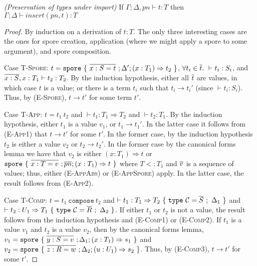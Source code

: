 \begin{lemma}
\emph{(Preservation of types under import)}
\label{appdx:lem:pres-import}
If $\Gamma ; \Delta, pn \vdash t : T$ then $\Gamma ; \Delta \vdash insert(pn, t) : T$
\end{lemma}
\begin{proof}
By induction on a derivation of $t : T$. The only three interesting cases are
the ones for spore creation, application (where we might apply a spore to some
argument), and spore composition.

Case \textsc{T-Spore}: $t = \texttt{spore}~\{~\overline{x : S = t}~; \Delta'; (x: T_1) \Rightarrow t_2~\}$, $\forall t_i \in \overline{t}.~\vdash t_i : S_i$, and $\overline{x : S}, x : T_1 \vdash t_2 : T_2$. By the induction hypothesis, either all $\overline{t}$ are values, in which case $t$ is a value; or there is a term $t_i$ such that $t_i \rightarrow t_i'$ (since $\vdash t_i : S_i$). Thus, by (\textsc{E-Spore}), $t \rightarrow t'$ for some term $t'$.

Case \textsc{T-App}: $t = t_1~t_2$ and $\vdash t_1 : T_1 \Rightarrow T_2$ and $\vdash t_2 : T_1$. By the induction hypothesis, either $t_1$ is a value $v_1$, or $t_1 \rightarrow t_1'$. In the latter case it follows from (\textsc{E-App1}) that $t \rightarrow t'$ for some $t'$. In the former case, by the induction hypothesis $t_2$ is either a value $v_2$ or $t_2 \rightarrow t_2'$. In the former case by the canonical forms lemma we have that $v_2$ is either $(x: T_1) \Rightarrow t$ or $\texttt{spore}~\{~\overline{x : T = v}~; \overline{pn} ; (x: T_1) \Rightarrow t~\}$ where $T <: T_1$ and $\overline{v}$ is a sequence of values; thus, either (\textsc{E-AppAbs}) or (\textsc{E-AppSpore}) apply. In the latter case, the result follows from (\textsc{E-App2}).

Case \textsc{T-Comp}: $t = t_1~\texttt{compose}~t_2$ and $\vdash t_1 : T_1 \Rightarrow T_2~\{~\texttt{type}~\mathcal{C} = \overline{S}~;~\Delta_1~\}$ and $\vdash t_2 : U_1 \Rightarrow T_1~\{~\texttt{type}~\mathcal{C} = \overline{R}~;~\Delta_2~\}$. If either $t_1$ or $t_2$ is not a value, the result follows from the induction hypothesis and (\textsc{E-Comp1}) or (\textsc{E-Comp2}). If $t_1$ is a value $v_1$ and $t_2$ is a value $v_2$, then by the canonical forms lemma, $v_1 = \texttt{spore}~\{~\overline{y : S = v}~; \Delta_1; (x: T_1) \Rightarrow s_1~\}$ and $v_2 = \texttt{spore}~\{~\overline{z : R = w}~; \Delta_2; (u: U_1) \Rightarrow s_2~\}$. Thus, by (\textsc{E-Comp3}), $t \rightarrow t'$ for some $t'$.

\end{proof}


